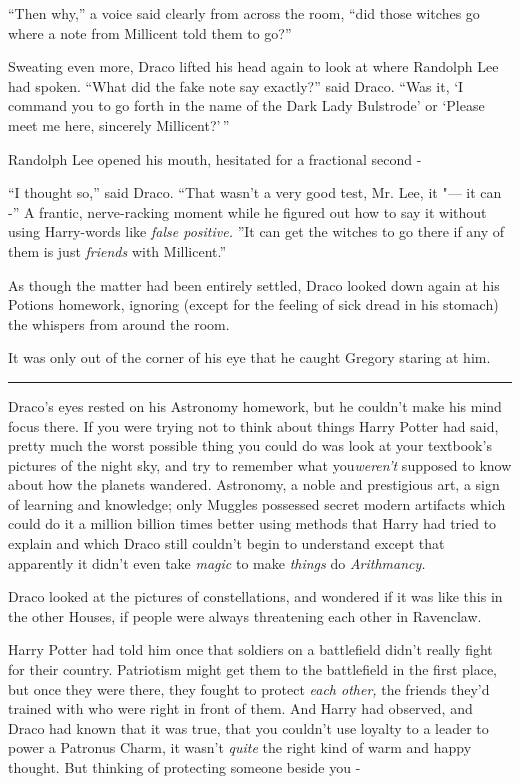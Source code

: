 ``Then why,'' a voice said clearly from across the room, ``did those
witches go where a note from Millicent told them to go?''

Sweating even more, Draco lifted his head again to look at where
Randolph Lee had spoken. ``What did the fake note say exactly?'' said
Draco. ``Was it, `I command you to go forth in the name of the Dark Lady
Bulstrode' or `Please meet me here, sincerely Millicent?'\,''

Randolph Lee opened his mouth, hesitated for a fractional second -

``I thought so,'' said Draco. ``That wasn't a very good test, Mr. Lee,
it "--- it can -'' A frantic, nerve-racking moment while he figured out how
to say it without using Harry-words like \emph{false positive.} ''It can
get the witches to go there if any of them is just \emph{friends} with
Millicent.''

As though the matter had been entirely settled, Draco looked down again
at his Potions homework, ignoring (except for the feeling of sick dread
in his stomach) the whispers from around the room.

It was only out of the corner of his eye that he caught Gregory staring
at him.

\begin{center}\rule{3in}{0.4pt}\end{center}

Draco's eyes rested on his Astronomy homework, but he couldn't make his
mind focus there. If you were trying not to think about things Harry
Potter had said, pretty much the worst possible thing you could do was
look at your textbook's pictures of the night sky, and try to remember
what you\emph{weren't} supposed to know about how the planets wandered.
Astronomy, a noble and prestigious art, a sign of learning and
knowledge; only Muggles possessed secret modern artifacts which could do
it a million billion times better using methods that Harry had tried to
explain and which Draco still couldn't begin to understand except that
apparently it didn't even take \emph{magic} to make \emph{things} do
\emph{Arithmancy.}

Draco looked at the pictures of constellations, and wondered if it was
like this in the other Houses, if people were always threatening each
other in Ravenclaw.

Harry Potter had told him once that soldiers on a battlefield didn't
really fight for their country. Patriotism might get them to the
battlefield in the first place, but once they were there, they fought to
protect \emph{each other,} the friends they'd trained with who were
right in front of them. And Harry had observed, and Draco had known that
it was true, that you couldn't use loyalty to a leader to power a
Patronus Charm, it wasn't \emph{quite} the right kind of warm and happy
thought. But thinking of protecting someone beside you -

